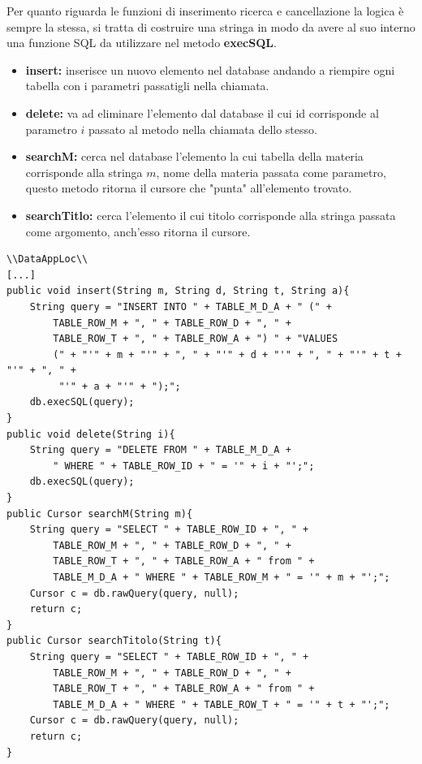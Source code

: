 \documentclass[a4paper, 50pt, twoside]{article}
\begin{document}
Per quanto riguarda le funzioni di inserimento ricerca e cancellazione la logica è sempre la stessa, si tratta di costruire una stringa in modo da avere al suo interno una funzione SQL da utilizzare nel metodo \textbf{execSQL}.
\begin{itemize}
\item \textbf{insert:} inserisce un nuovo elemento nel database andando a riempire ogni tabella con i parametri passatigli nella chiamata.
\item \textbf{delete:} va ad eliminare l'elemento dal database il cui id corrisponde al parametro $i$ passato al metodo nella chiamata dello stesso.
\item \textbf{searchM:} cerca nel database l'elemento la cui tabella della materia corrisponde alla stringa $m$, nome della materia passata come parametro, questo metodo ritorna il cursore che "punta" all'elemento trovato.
\item \textbf{searchTitlo:} cerca l'elemento il cui titolo corrisponde alla stringa passata come argomento, anch'esso ritorna il cursore.
\end{itemize}

\begin{lstlisting}
\\DataAppLoc\\
[...]
public void insert(String m, String d, String t, String a){
	String query = "INSERT INTO " + TABLE_M_D_A + " (" + 
		TABLE_ROW_M + ", " + TABLE_ROW_D + ", " + 
		TABLE_ROW_T + ", " + TABLE_ROW_A + ") " + "VALUES 
		(" + "'" + m + "'" + ", " + "'" + d + "'" + ", " + "'" + t + "'" + ", " +
		 "'" + a + "'" + ");";
	db.execSQL(query);
}
public void delete(String i){
	String query = "DELETE FROM " + TABLE_M_D_A +
		" WHERE " + TABLE_ROW_ID + " = '" + i + "';";
	db.execSQL(query);
}
public Cursor searchM(String m){
	String query = "SELECT " + TABLE_ROW_ID + ", " +
		TABLE_ROW_M + ", " + TABLE_ROW_D + ", " +
		TABLE_ROW_T + ", " + TABLE_ROW_A + " from " +
		TABLE_M_D_A + " WHERE " + TABLE_ROW_M + " = '" + m + "';";
	Cursor c = db.rawQuery(query, null);
	return c;
}
public Cursor searchTitolo(String t){
	String query = "SELECT " + TABLE_ROW_ID + ", " +
		TABLE_ROW_M + ", " + TABLE_ROW_D + ", " +
		TABLE_ROW_T + ", " + TABLE_ROW_A + " from " +
		TABLE_M_D_A + " WHERE " + TABLE_ROW_T + " = '" + t + "';";
	Cursor c = db.rawQuery(query, null);
	return c;
}
\end{lstlisting}
\end{document}
